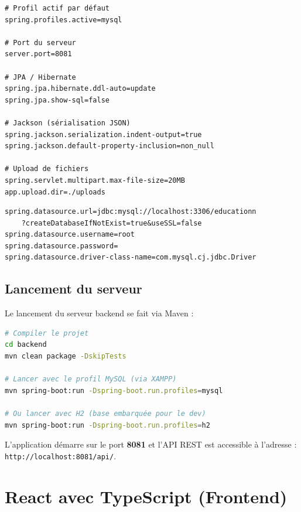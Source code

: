 \begin{lstlisting}[caption={Fichier application.properties — Configuration principale}]
# Profil actif par défaut
spring.profiles.active=mysql

# Port du serveur
server.port=8081

# JPA / Hibernate
spring.jpa.hibernate.ddl-auto=update
spring.jpa.show-sql=false

# Jackson (sérialisation JSON)
spring.jackson.serialization.indent-output=true
spring.jackson.default-property-inclusion=non_null

# Upload de fichiers
spring.servlet.multipart.max-file-size=20MB
app.upload.dir=./uploads
\end{lstlisting}

\begin{lstlisting}[caption={Fichier application-mysql.properties — Profil MySQL}]
spring.datasource.url=jdbc:mysql://localhost:3306/educationn
    ?createDatabaseIfNotExist=true&useSSL=false
spring.datasource.username=root
spring.datasource.password=
spring.datasource.driver-class-name=com.mysql.cj.jdbc.Driver
\end{lstlisting}

\subsection{Lancement du serveur}

Le lancement du serveur backend se fait via Maven :

\begin{lstlisting}[language=bash,caption={Commandes de build et de lancement}]
# Compiler le projet
cd backend
mvn clean package -DskipTests

# Lancer avec le profil MySQL (via XAMPP)
mvn spring-boot:run -Dspring-boot.run.profiles=mysql

# Ou lancer avec H2 (base embarquée pour le dev)
mvn spring-boot:run -Dspring-boot.run.profiles=h2
\end{lstlisting}

L'application démarre sur le port \textbf{8081} et l'API REST est accessible à l'adresse : \texttt{http://localhost:8081/api/}.

\section{React avec TypeScript (Frontend)}


